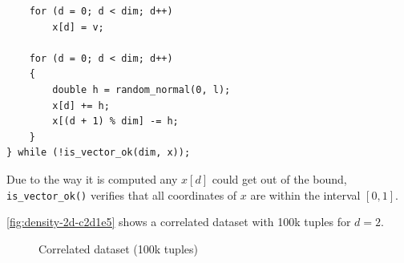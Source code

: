 \begin{itemize}
\begin{lstlisting}
	for (d = 0; d < dim; d++)
		x[d] = v;

	for (d = 0; d < dim; d++)
	{
		double h = random_normal(0, l);
		x[d] += h;
		x[(d + 1) % dim] -= h;
	}
} while (!is_vector_ok(dim, x));
\end{lstlisting}
\medskip

Due to the way it is computed any $x[d]$ could get out of the bound,
\lstinline{is_vector_ok()} verifies that all coordinates of $x$ are
within the interval $[0,1]$.

\autoref{fig:density-2d-c2d1e5} shows a correlated dataset with
100k tuples for $d = 2$.

\begin{figure}[htbp]
\centering
{}%
%
\caption{Correlated dataset (100k tuples)}%
\label{fig:density-2d-c2d1e5}%
\end{figure}


\end{itemize}
